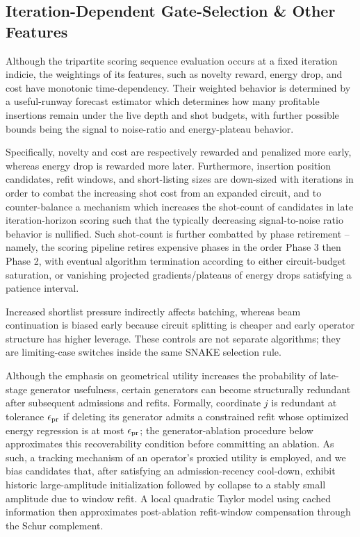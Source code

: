 \documentclass[
  reprint,
  amsmath,
  amssymb,
  aps,
  pra,
  nofootinbib,
  superscriptaddress,
  floatfix
]{revtex4-2}
\begin{document}
\subsection{Iteration-Dependent Gate-Selection \& Other Features}
Although the tripartite scoring sequence evaluation occurs at a fixed iteration indicie, the weightings of its features, such as novelty reward, energy drop, and cost have monotonic time-dependency. Their weighted behavior is determined by a useful-runway forecast estimator which determines how many profitable insertions remain under the live depth and shot budgets, with further possible bounds being the signal to noise-ratio and energy-plateau behavior.

Specifically, novelty and cost are respectively rewarded and penalized more early, whereas energy drop is rewarded more later. Furthermore, insertion position candidates, refit windows, and short-listing sizes are down-sized with iterations in order to combat the increasing shot cost from an expanded circuit, and to counter-balance a mechanism which increases the shot-count of candidates in late iteration-horizon scoring such that the typically decreasing signal-to-noise ratio behavior is nullified. Such shot-count is further combatted by phase retirement -- namely, the scoring pipeline retires expensive phases in the order Phase 3 then Phase 2, with eventual algorithm termination according to either circuit-budget saturation, or vanishing projected gradients/plateaus of energy drops satisfying a patience interval.

Increased shortlist pressure indirectly affects batching, whereas beam continuation is biased early because circuit splitting is cheaper and early operator structure has higher leverage. These controls are not separate algorithms; they are limiting-case switches inside the same SNAKE selection rule.

Although the emphasis on geometrical utility increases the probability of late-stage generator usefulness, certain generators can become structurally redundant after subsequent admissions and refits. Formally, coordinate $j$ is redundant at tolerance $\epsilon_{\rm pr}$ if deleting its generator admits a constrained refit whose optimized energy regression is at most $\epsilon_{\rm pr}$; the generator-ablation procedure below approximates this recoverability condition before committing an ablation. As such, a tracking mechanism of an operator's proxied utility is employed, and we bias candidates that, after satisfying an admission-recency cool-down, exhibit historic large-amplitude initialization followed by collapse to a stably small amplitude due to window refit. A local quadratic Taylor model using cached information then approximates post-ablation refit-window compensation through the Schur complement.
\end{document}
